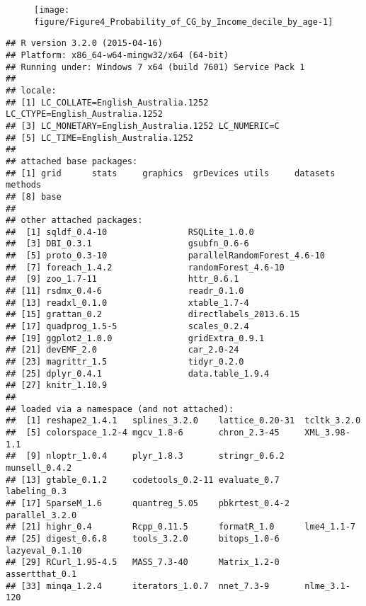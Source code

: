 \documentclass{grattan}\usepackage[]{graphicx}\usepackage[]{color}
\makeatletter
\newenvironment{kframe}{%
 \def\at@end@of@kframe{}%
 \ifinner\ifhmode%
  \def\at@end@of@kframe{\end{minipage}}%
  \begin{minipage}{\columnwidth}%
 \fi\fi%
 \def\FrameCommand##1{\hskip\@totalleftmargin \hskip-\fboxsep
 \colorbox{shadecolor}{##1}\hskip-\fboxsep
     \hskip-\linewidth \hskip-\@totalleftmargin \hskip\columnwidth}%
 \MakeFramed {\advance\hsize-\width
   \@totalleftmargin\z@ \linewidth\hsize
   \@setminipage}}%
 {\par\unskip\endMakeFramed%
 \at@end@of@kframe}
\newenvironment{knitrout}{}{} %
\makeatother
\begin{document}
\begin{figure}
\texttt{[image: figure/Figure4\_Probability\_of\_CG\_by\_Income\_decile\_by\_age-1]}
\end{figure}

\begin{knitrout}
\color{fgcolor}\begin{kframe}
\begin{verbatim}
## R version 3.2.0 (2015-04-16)
## Platform: x86_64-w64-mingw32/x64 (64-bit)
## Running under: Windows 7 x64 (build 7601) Service Pack 1
## 
## locale:
## [1] LC_COLLATE=English_Australia.1252  LC_CTYPE=English_Australia.1252   
## [3] LC_MONETARY=English_Australia.1252 LC_NUMERIC=C                      
## [5] LC_TIME=English_Australia.1252    
## 
## attached base packages:
## [1] grid      stats     graphics  grDevices utils     datasets  methods  
## [8] base     
## 
## other attached packages:
##  [1] sqldf_0.4-10                RSQLite_1.0.0              
##  [3] DBI_0.3.1                   gsubfn_0.6-6               
##  [5] proto_0.3-10                parallelRandomForest_4.6-10
##  [7] foreach_1.4.2               randomForest_4.6-10        
##  [9] zoo_1.7-11                  httr_0.6.1                 
## [11] rsdmx_0.4-6                 readr_0.1.0                
## [13] readxl_0.1.0                xtable_1.7-4               
## [15] grattan_0.2                 directlabels_2013.6.15     
## [17] quadprog_1.5-5              scales_0.2.4               
## [19] ggplot2_1.0.0               gridExtra_0.9.1            
## [21] devEMF_2.0                  car_2.0-24                 
## [23] magrittr_1.5                tidyr_0.2.0                
## [25] dplyr_0.4.1                 data.table_1.9.4           
## [27] knitr_1.10.9               
## 
## loaded via a namespace (and not attached):
##  [1] reshape2_1.4.1   splines_3.2.0    lattice_0.20-31  tcltk_3.2.0     
##  [5] colorspace_1.2-4 mgcv_1.8-6       chron_2.3-45     XML_3.98-1.1    
##  [9] nloptr_1.0.4     plyr_1.8.3       stringr_0.6.2    munsell_0.4.2   
## [13] gtable_0.1.2     codetools_0.2-11 evaluate_0.7     labeling_0.3    
## [17] SparseM_1.6      quantreg_5.05    pbkrtest_0.4-2   parallel_3.2.0  
## [21] highr_0.4        Rcpp_0.11.5      formatR_1.0      lme4_1.1-7      
## [25] digest_0.6.8     tools_3.2.0      bitops_1.0-6     lazyeval_0.1.10 
## [29] RCurl_1.95-4.5   MASS_7.3-40      Matrix_1.2-0     assertthat_0.1  
## [33] minqa_1.2.4      iterators_1.0.7  nnet_7.3-9       nlme_3.1-120
\end{verbatim}
\end{kframe}
\end{knitrout}

\printbibliography
\end{document}
